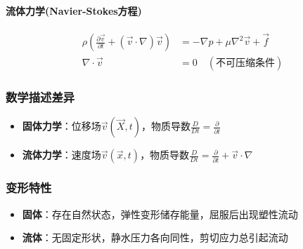 \begin{example}
    \paragraph{流体力学(Navier-Stokes方程)}
    \begin{align*}
        \rho \left( \frac{\partial \vec{v}}{\partial t} + (\vec{v} \cdot \nabla)\vec{v} \right) &= -\nabla p + \mu \nabla^2 \vec{v} + \vec{f} \\
        \nabla \cdot \vec{v} &= 0 \quad (\text{不可压缩条件})
    \end{align*}
    
    \subsubsection{数学描述差异}
    \begin{itemize}
        \item \textbf{固体力学}：位移场$\vec{v}(\vec{X},t)$，物质导数$\frac{D}{Dt} = \frac{\partial}{\partial t}$
        \item \textbf{流体力学}：速度场$\vec{v}(\vec{x},t)$，物质导数$\frac{D}{Dt} = \frac{\partial}{\partial t} + \vec{v} \cdot \nabla$
    \end{itemize}
    
    \subsubsection{变形特性}
    \begin{itemize}
        \item \textbf{固体}：存在自然状态，弹性变形储存能量，屈服后出现塑性流动
        \item \textbf{流体}：无固定形状，静水压力各向同性，剪切应力总引起流动
    \end{itemize}
\end{example}
